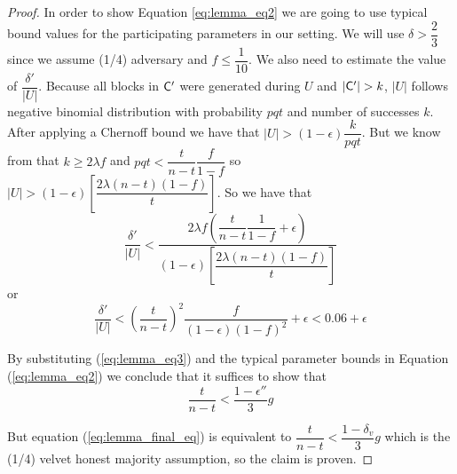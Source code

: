 \begin{proof}
In order to show Equation \ref{eq:lemma_eq2} we are going to use typical bound values for the participating parameters in our setting. We will use $\delta > \dfrac{2}{3}$ since we assume (1/4) adversary and $f \leq \dfrac{1}{10}$. We also need to estimate the value of $\dfrac{\delta'}{\lvert U \rvert}$. Because all blocks in $\mathsf{C}'$ were generated during $U$ and $\lvert \mathsf{C}' \rvert > k $, $\lvert U \rvert$ follows negative binomial distribution with probability $pqt$ and number of successes $k$. After applying a Chernoff bound we have that $\lvert U \rvert > (1-\epsilon) \dfrac{k}{pqt}$. But we know from \cite{backbone} that $k \geq 2\lambda f$ and $pqt < \dfrac{t}{n-t} \dfrac{f}{1-f}$ so  $\lvert U \rvert > (1-\epsilon)[\dfrac{2\lambda (n-t)(1-f)}{t}]$. So we have that
\begin{equation*}
    \dfrac{\delta'}{\lvert U \rvert} < \dfrac{2\lambda f (\dfrac{t}{n-t} \dfrac{1}{1-f} + \epsilon)}{(1-\epsilon)[\dfrac{2\lambda (n-t)(1-f)}{t}]}
\end{equation*} or
\begin{equation}\label{eq:lemma_eq3}
    \dfrac{\delta'}{\lvert U \rvert} < \left( \dfrac{t}{n-t} \right)^2 \dfrac{f}{(1-\epsilon)(1-f)^2} + \epsilon < 0.06 + \epsilon
\end{equation}

By substituting (\ref{eq:lemma_eq3}) and the typical parameter bounds in Equation (\ref{eq:lemma_eq2}) we conclude that it suffices to show that
\begin{equation}\label{eq:lemma_final_eq}
    \dfrac{t}{n-t} < \dfrac{1-\epsilon''}{3}g
\end{equation}

But equation (\ref{eq:lemma_final_eq}) is equivalent to $\dfrac{t}{n-t} < \dfrac{1-\delta_v}{3}g$ which is the (1/4) velvet honest majority assumption, so the claim is proven.
\end{proof}

